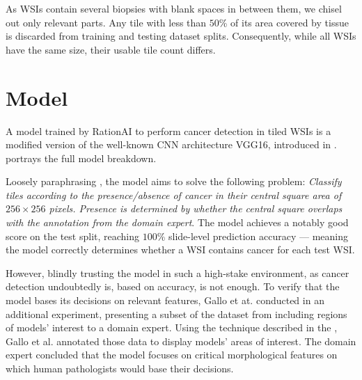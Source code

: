 As WSIs contain several biopsies with blank spaces in between them, we chisel out only relevant parts.
Any tile with less than $50$\% of its area covered by tissue is discarded from training and testing dataset splits.
Consequently, while all WSIs have the same size, their usable tile count differs.

\section{Model}\label{model}

A model trained by RationAI to perform cancer detection in tiled WSIs is a modified version of the well-known CNN architecture VGG16, introduced in \cite{vgg16}.
 portrays the full model breakdown.

Loosely paraphrasing \cite{gallo}, the model aims to solve the following problem: \emph{Classify tiles according to the presence/absence of cancer in their central square area of $256 \times 256 $ pixels. Presence is determined by whether the central square overlaps with the annotation from the domain expert}. The model achieves a notably good score on the test split, reaching $100$\% slide-level prediction accuracy --- meaning the model correctly determines whether a WSI contains cancer for each test WSI.

However, blindly trusting the model in such a high-stake environment, as cancer detection undoubtedly is, based on accuracy, is not enough.
To verify that the model bases its decisions on relevant features, Gallo et at. conducted in \cite{gallo} an additional experiment, presenting a subset of the dataset from  including regions of models' interest to a domain expert.
Using the technique described in the , Gallo et al. annotated those data to display models' areas of interest.
The domain expert concluded that the model focuses on critical morphological features \cite{gallo} on which human pathologists would base their decisions.

